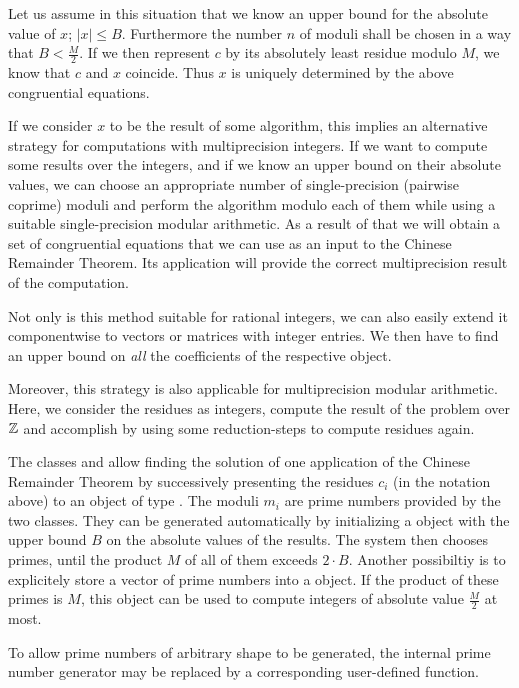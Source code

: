 Let us assume in this situation that we know an upper bound for the absolute value of $x$; $|x|
\leq B$.  Furthermore the number $n$ of moduli shall be chosen in a way that $B < \frac{M}{2}$.
If we then represent $c$ by its absolutely least residue modulo $M$, we know that $c$ and $x$
coincide.  Thus $x$ is uniquely determined by the above congruential equations.

If we consider $x$ to be the result of some algorithm, this implies an alternative strategy for
computations with multiprecision integers.  If we want to compute some results over the integers,
and if we know an upper bound on their absolute values, we can choose an appropriate number of
single-precision (pairwise coprime) moduli and perform the algorithm modulo each of them while
using a suitable single-precision modular arithmetic.  As a result of that we will obtain a set
of congruential equations that we can use as an input to the Chinese Remainder Theorem.  Its
application will provide the correct multiprecision result of the computation.

Not only is this method suitable for rational integers, we can also easily extend it
componentwise to vectors or matrices with integer entries.  We then have to find an upper bound
on \emph{all} the coefficients of the respective object.

Moreover, this strategy is also applicable for multiprecision modular arithmetic.  Here, we
consider the residues as integers, compute the result of the problem over $\mathbb{Z}$ and accomplish
by using some reduction-steps to compute residues again.

The classes  and  allow finding the solution of one application of the
Chinese Remainder Theorem by successively presenting the residues $c_i$ (in the notation above)
to an object of type .  The moduli $m_i$ are prime numbers provided by the two
classes.  They can be generated automatically by initializing a  object with the
upper bound $B$ on the absolute values of the results.  The system then chooses primes, until
the product $M$ of all of them exceeds $2 \cdot B$.  Another possibiltiy is to explicitely store
a vector of prime numbers into a  object.  If the product of these primes is
$M$, this object can be used to compute integers of absolute value $\frac{M}{2}$ at most.

To allow prime numbers of arbitrary shape to be generated, the internal prime number generator
may be replaced by a corresponding user-defined function.

